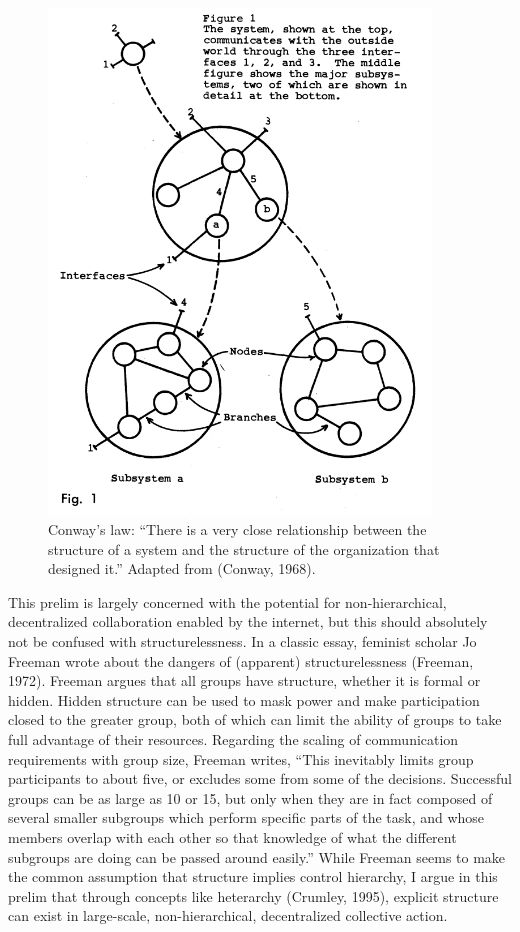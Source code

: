 \begin{figure}
\centering
\includegraphics[width=4in]{images/fig-conway.png}
\caption{
Conway's law: “There is a very close relationship between the structure of a system and the structure of the organization that designed it.” Adapted from (Conway, 1968).
\label{fig:conway}
}
\end{figure}

This prelim is largely concerned with the potential for non-hierarchical, decentralized collaboration enabled by the internet, but this should absolutely not be confused with structurelessness. In a classic essay, feminist scholar Jo Freeman wrote about the dangers of (apparent) structurelessness (Freeman, 1972). Freeman argues that all groups have structure, whether it is formal or hidden. Hidden structure can be used to mask power and make participation closed to the greater group, both of which can limit the ability of groups to take full advantage of their resources. Regarding the scaling of communication requirements with group size, Freeman writes, “This inevitably limits group participants to about five, or excludes some from some of the decisions. Successful groups can be as large as 10 or 15, but only when they are in fact composed of several smaller subgroups which perform specific parts of the task, and whose members overlap with each other so that knowledge of what the different subgroups are doing can be passed around easily.” While Freeman seems to make the common assumption that structure implies control hierarchy, I argue in this prelim that through concepts like heterarchy (Crumley, 1995), explicit structure can exist in large-scale, non-hierarchical, decentralized collective action.

